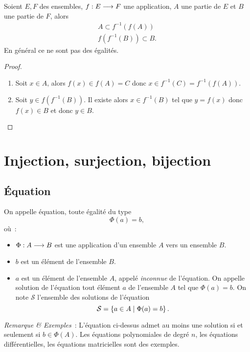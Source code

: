 
\begin{prop}
  Soient \(E, F\) des ensembles, \(f:E \longrightarrow{} F\) une application, \(A\)
  une partie de \(E\) et \(B\) une partie de \(F\), alors
  \begin{gather}
    A \subset{}f^{-1}(f(A)) \\
    f(f^{-1}(B)) \subset{}B.
  \end{gather}
  En général ce ne sont pas des égalités.
\end{prop}

\begin{proof}
  \begin{enumerate}
    \item Soit \(x \in{}A\), alors \(f(x) \in{}f(A) = C\) donc \(x \in{}
      f^{-1}(C) = f^{-1}(f(A))\).
    \item Soit \(y \in{}f(f^{-1}(B))\). Il existe alors \(x \in{}f^{-1}(B)\)
      tel que \(y = f(x)\) donc \(f(x) \in{}B\) et donc \(y \in{}B\).
  \end{enumerate}
\end{proof}

\section{Injection, surjection, bijection}\label{chap3-sec:injsurbij}

\subsection{Équation}\label{chap3-subsec:equation}

\begin{defdef}
  On appelle équation, toute égalité du type
  \begin{equation}
    \Phi(a) = b,
  \end{equation}
  où~:
  \begin{itemize}
    \item \(\Phi:A \longrightarrow{} B\) est une application d'un ensemble \(A\)
      vers un ensemble \(B\).
    \item \(b\) est un élément de l'ensemble \(B\).
    \item \(a\) est un élément de l'ensemble \(A\), appelé \emph{inconnue} de
      l'équation. On appelle solution de l'équation tout élément \(a\) de
      l'ensemble \(A\) tel que \(\Phi(a) = b\). On note \(\mathcal{S}\)
      l'ensemble des solutions de l'équation
      \begin{equation}
        \mathcal{S} = \left\{a \in{}A\mathrel{}\middle|\mathrel{}\Phi(a) = b\right\}.
      \end{equation}
  \end{itemize}
\end{defdef}
\emph{Remarque \& Exemples}~: L'équation ci-dessus admet au moins une solution
si et seulement si \(b \in{}\Phi(A)\). Les équations polynomiales de degré \(n\),
les équations différentielles, les équations matricielles sont des exemples.

